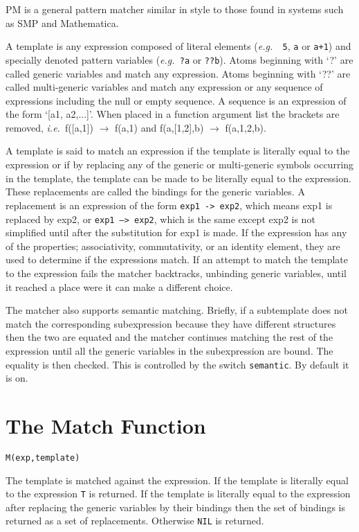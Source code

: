 \documentclass[11pt,letterpaper]{book}
\makeatletter
\newcommand{\underscore}{\_}
\newcommand{\ttindex}[1]{{\renewcommand{\_}{\protect\underscore}%
                          \index{#1@{\tt #1}}}}
\makeatother
\begin{document}
PM is a general pattern matcher similar in style to those found in systems
such as SMP and Mathematica.

A template is any expression composed of literal elements ({\em e.g.\ }{\tt
5}, {\tt a} or {\tt a+1}) and specially denoted pattern variables
({\em e.g.\ }{\tt ?a} or {\tt ??b}).  Atoms
beginning with `?' are called generic variables and match any expression.
Atoms beginning with `??' are called multi-generic variables and match any
expression or any sequence of expressions including the null or empty
sequence.  A sequence is an expression of the form `[a1, a2,...]'.  When
placed in a function argument list the brackets are removed, {\em
i.e.\ }f([a,1]) $\rightarrow$ f(a,1) and f(a,[1,2],b) $\rightarrow$ f(a,1,2,b).

A template is said to match an  expression  if the template is literally
equal to the expression or if by replacing any of the generic or
multi-generic symbols occurring in the template, the template can be made
to be literally equal to the expression.  These replacements are called the
bindings for the generic variables.  A replacement is an expression of the
form {\tt exp1 -> exp2}, which means exp1 is replaced by exp2, or
{\tt exp1 --> exp2}, which is the same except exp2 is not simplified
until after the
substitution for exp1 is made.  If the expression has any of the
properties; associativity, commutativity, or an identity element, they are
used to determine if the expressions match.  If an attempt to match the
template to the expression fails the matcher backtracks, unbinding generic
variables, until it reached a place were it can make a different choice.

The matcher also supports semantic matching.  Briefly, if a subtemplate
does not match the corresponding subexpression because they have different
structures then the two are equated and the matcher continues matching the
rest of the expression until all the generic variables in the subexpression
are bound.  The equality is then checked.  This is controlled by the switch
\ttindex{SEMANTIC}{\tt semantic}.  By default it is on.

\section{The Match Function}

{\tt M(exp,template)}\ttindex{M}

The template is matched against the expression.  If the template is
literally equal to the expression {\tt T} is returned.  If the
template is literally equal to the expression after replacing the
generic variables by their bindings then the set of bindings is
returned as a set of replacements.  Otherwise {\tt NIL} is returned.
\end{document}

